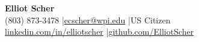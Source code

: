 \begin{center}
{\Large \textbf{Elliot Scher}}\\[2pt]
(803) 873-3478 \quad|\quad \href{mailto:ecscher@wpi.edu}{ecscher@wpi.edu} \quad|\quad US Citizen\\
\href{https://linkedin.com/in/elliotscher}{linkedin.com/in/elliotscher} \quad|\quad \href{https://github.com/ElliotScher}{github.com/ElliotScher}
\end{center}